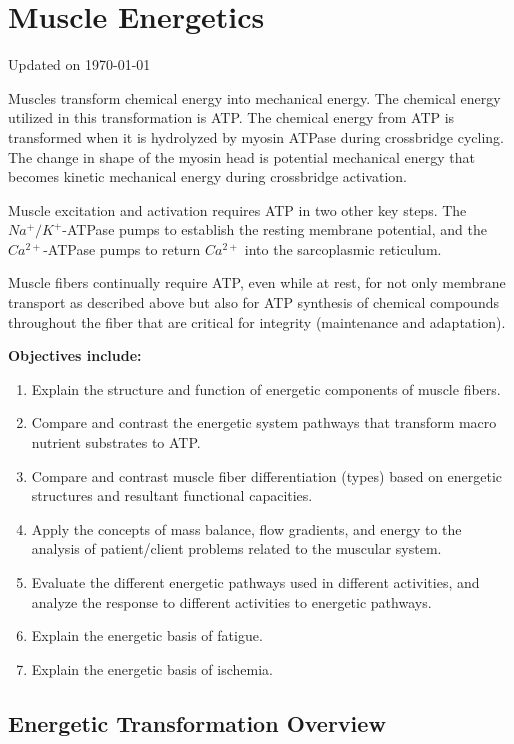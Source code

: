 \chapter{Muscle Energetics}\label{chp:energetics}
Updated on \today
\minitoc

Muscles transform chemical energy into mechanical energy. The chemical energy utilized in this transformation is ATP. The chemical energy from ATP is transformed when it is hydrolyzed by myosin ATPase during crossbridge cycling. The change in shape of the myosin head is potential mechanical energy that becomes kinetic mechanical energy during crossbridge activation. 

Muscle excitation and activation requires ATP in two other key steps. The $Na^+ / K^+$-ATPase pumps to establish the resting membrane potential, and the $Ca^{2+}$-ATPase pumps to return $Ca^{2+}$ into the sarcoplasmic reticulum.

Muscle fibers continually require ATP, even while at rest, for not only membrane transport as described above but also for ATP synthesis of chemical compounds throughout the fiber that are critical for integrity (maintenance and adaptation).

\vspace{5mm}

\textbf{Objectives include:}
\begin{enumerate}
    \item Explain the structure and function of energetic components of muscle fibers.
    \item Compare and contrast the energetic system pathways that transform macro nutrient substrates to ATP.
    \item Compare and contrast muscle fiber differentiation (types) based on energetic structures and resultant functional capacities.
    \item  Apply the concepts of mass balance, flow gradients, and energy to the analysis of patient/client problems related to the muscular system.
     \item Evaluate the different energetic pathways used in different activities, and analyze the response to different activities to energetic pathways.
     \item Explain the energetic basis of fatigue.
     \item Explain the energetic basis of ischemia.
\end{enumerate}

\section{Energetic Transformation Overview}

